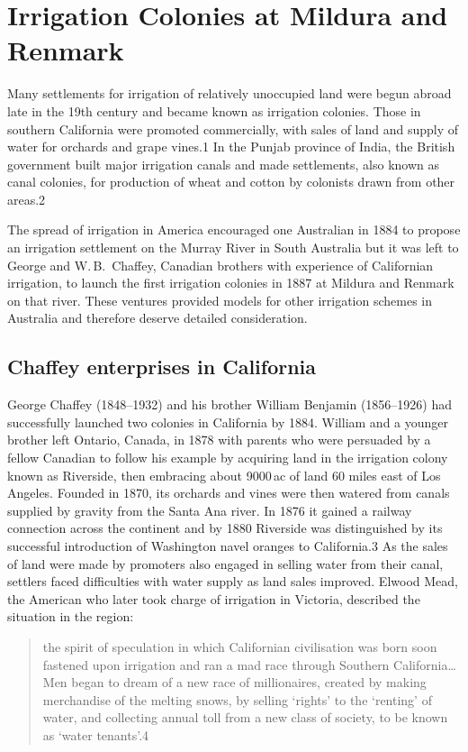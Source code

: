 
\chapter{Irrigation Colonies at Mildura and Renmark}

Many settlements for irrigation of relatively unoccupied land were
begun abroad late in the 19th century and became known as irrigation
colonies. Those in southern California were promoted commercially,
with sales of land and supply of water for orchards and grape vines.1
In the Punjab province of India, the British government built major
irrigation canals and made settlements, also known as canal colonies,
for production of wheat and cotton by colonists drawn from other
areas.2

The spread of irrigation in America encouraged one Australian in 1884
to propose an irrigation settlement on the Murray River in South
Australia but it was left to George and W.\,B.~Chaffey, Canadian
brothers with experience of Californian irrigation, to launch the
first irrigation colonies in 1887 at Mildura and Renmark on that
river. These ventures provided models for other irrigation schemes in
Australia and therefore deserve detailed consideration.

\section{Chaffey enterprises in California}

George Chaffey (1848--1932) and his brother William Benjamin
(1856--1926) had successfully launched two colonies in California by
1884.  William and a younger brother left Ontario, Canada, in 1878
with parents who were persuaded by a fellow Canadian to follow his
example by acquiring land in the irrigation colony known as Riverside,
then embracing about 9000\,ac of land 60 miles east of Los
Angeles. Founded in 1870, its orchards and vines were then watered
from canals supplied by gravity from the Santa Ana river.  In 1876 it
gained a railway connection across the continent and by 1880 Riverside
was distinguished by its successful introduction of Washington navel
oranges to California.3 As the sales of land were made by promoters
also engaged in selling water from their canal, settlers faced
difficulties with water supply as land sales improved.  Elwood Mead,
the American who later took charge of irrigation in Victoria,
described the situation in the region:
\begin{quote}
	the spirit of speculation in which Californian civilisation
	was born soon fastened upon irrigation and ran a mad race
	through Southern California\ldots Men began to dream of a new
	race of millionaires, created by making merchandise of the
	melting snows, by selling `rights' to the `renting' of water,
	and collecting annual toll from a new class of society, to be
	known as `water tenants'.4
\end{quote}

